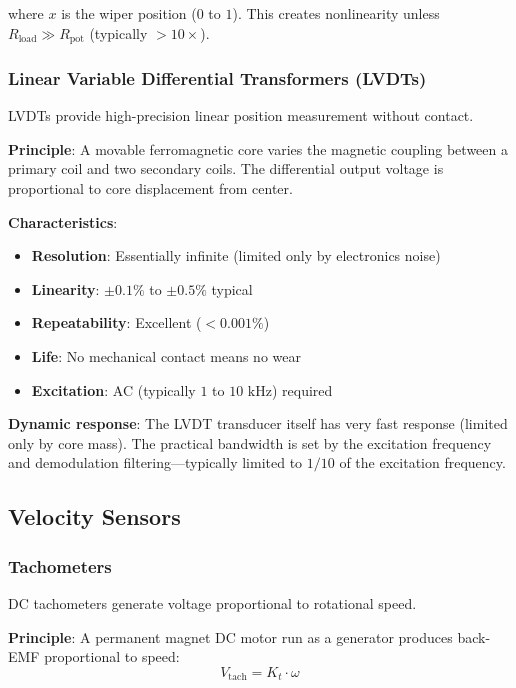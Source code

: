 where $x$ is the wiper position ($0$ to $1$). This creates nonlinearity unless $R_{\text{load}} \gg R_{\text{pot}}$ (typically $>10\times$).

\subsubsection{Linear Variable Differential Transformers (LVDTs)}

LVDTs provide high-precision linear position measurement without contact.

\textbf{Principle}: A movable ferromagnetic core varies the magnetic coupling between a primary coil and two secondary coils. The differential output voltage is proportional to core displacement from center.

\textbf{Characteristics}:
\begin{itemize}
    \item \textbf{Resolution}: Essentially infinite (limited only by electronics noise)
    \item \textbf{Linearity}: $\pm 0.1\%$ to $\pm 0.5\%$ typical
    \item \textbf{Repeatability}: Excellent ($<0.001\%$)
    \item \textbf{Life}: No mechanical contact means no wear
    \item \textbf{Excitation}: AC (typically $1$ to $10\text{ kHz}$) required
\end{itemize}

\textbf{Dynamic response}: The LVDT transducer itself has very fast response (limited only by core mass). The practical bandwidth is set by the excitation frequency and demodulation filtering---typically limited to $1/10$ of the excitation frequency.

\subsection{Velocity Sensors}

\subsubsection{Tachometers}

DC tachometers generate voltage proportional to rotational speed.

\textbf{Principle}: A permanent magnet DC motor run as a generator produces back-EMF proportional to speed:
\begin{equation}
V_{\text{tach}} = K_t \cdot \omega
\label{eq:tachometer}
\end{equation}

